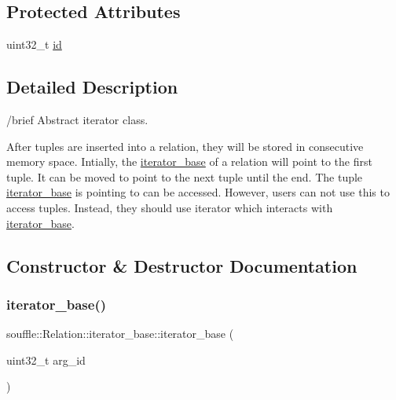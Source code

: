 \subsection*{Protected Attributes}
\begin{DoxyCompactItemize}
\item 
uint32\+\_\+t \hyperlink{classsouffle_1_1_relation_1_1iterator__base_a43f50972f2975e49d08634ff0af7b664}{id}
\end{DoxyCompactItemize}


\subsection{Detailed Description}
/brief Abstract iterator class.

After tuples are inserted into a relation, they will be stored in consecutive memory space. Intially, the \hyperlink{classsouffle_1_1_relation_1_1iterator__base}{iterator\+\_\+base} of a relation will point to the first tuple. It can be moved to point to the next tuple until the end. The tuple \hyperlink{classsouffle_1_1_relation_1_1iterator__base}{iterator\+\_\+base} is pointing to can be accessed. However, users can not use this to access tuples. Instead, they should use iterator which interacts with \hyperlink{classsouffle_1_1_relation_1_1iterator__base}{iterator\+\_\+base}. 

\subsection{Constructor \& Destructor Documentation}
\mbox{\label{classsouffle_1_1_relation_1_1iterator__base_aabfa22b6444822cefcce4a1dcb7b796b}} 
\subsubsection{\texorpdfstring{iterator\+\_\+base()}{iterator\_base()}}
{\footnotesize\ttfamily souffle\+::\+Relation\+::iterator\+\_\+base\+::iterator\+\_\+base (\begin{DoxyParamCaption}\item[{uint32\+\_\+t}]{arg\+\_\+id }\end{DoxyParamCaption})\hspace{0.3cm}{\ttfamily [inline]}}

